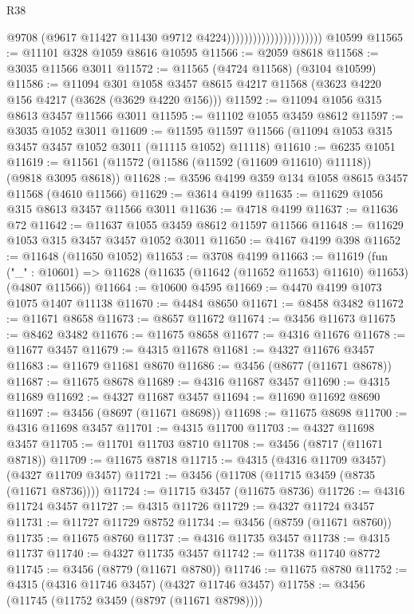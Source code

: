 \begin{lexlean}{R38}
\begin{coremodule}
                                              @9708
                                              (@9617 @11427 @11430 @9712 @4224))))))))))))))))))))))
    @10599
@11565 := @11101 @328 @1059 @8616 @10595
@11566 := @2059 @8618
@11568 := @3035 @11566 @3011
@11572 := @11565 (@4724 @11568) (@3104 @10599)
@11586 := @11094
    @301
    @1058
    @3457
    @8615
    @4217
    @11568
    (@3623 @4220 @156 @4217 (@3628 (@3629 @4220 @156)))
@11592 := @11094 @1056 @315 @8613 @3457 @11566 @3011
@11595 := @11102 @1055 @3459 @8612
@11597 := @3035 @1052 @3011
@11609 := @11595 @11597 @11566 (@11094 @1053 @315 @3457 @3457 @1052 @3011 (@11115 @1052) @11118)
@11610 := @6235 @1051
@11619 := @11561 (@11572 (@11586 (@11592 (@11609 @11610) @11118)) (@9818 @3095 @8618))
@11628 := @3596 @4199 @359 @134 @1058 @8615 @3457 @11568 (@4610 @11566)
@11629 := @3614 @4199
@11635 := @11629 @1056 @315 @8613 @3457 @11566 @3011
@11636 := @4718 @4199
@11637 := @11636 @72
@11642 := @11637 @1055 @3459 @8612 @11597 @11566
@11648 := @11629 @1053 @315 @3457 @3457 @1052 @3011
@11650 := @4167 @4199 @398
@11652 := @11648 (@11650 @1052)
@11653 := @3708 @4199
@11663 := @11619
    (fun ("_" : @10601) => @11628 (@11635 (@11642 (@11652 @11653) @11610) @11653) (@4807 @11566))
@11664 := @10600 @4595
@11669 := @4470 @4199 @1073 @1075 @1407 @11138
@11670 := @4484 @8650
@11671 := @8458 @3482
@11672 := @11671 @8658
@11673 := @8657 @11672
@11674 := @3456 @11673
@11675 := @8462 @3482
@11676 := @11675 @8658
@11677 := @4316 @11676
@11678 := @11677 @3457
@11679 := @4315 @11678
@11681 := @4327 @11676 @3457
@11683 := @11679 @11681 @8670
@11686 := @3456 (@8677 (@11671 @8678))
@11687 := @11675 @8678
@11689 := @4316 @11687 @3457
@11690 := @4315 @11689
@11692 := @4327 @11687 @3457
@11694 := @11690 @11692 @8690
@11697 := @3456 (@8697 (@11671 @8698))
@11698 := @11675 @8698
@11700 := @4316 @11698 @3457
@11701 := @4315 @11700
@11703 := @4327 @11698 @3457
@11705 := @11701 @11703 @8710
@11708 := @3456 (@8717 (@11671 @8718))
@11709 := @11675 @8718
@11715 := @4315 (@4316 @11709 @3457) (@4327 @11709 @3457)
@11721 := @3456 (@11708 (@11715 @3459 (@8735 (@11671 @8736))))
@11724 := @11715 @3457 (@11675 @8736)
@11726 := @4316 @11724 @3457
@11727 := @4315 @11726
@11729 := @4327 @11724 @3457
@11731 := @11727 @11729 @8752
@11734 := @3456 (@8759 (@11671 @8760))
@11735 := @11675 @8760
@11737 := @4316 @11735 @3457
@11738 := @4315 @11737
@11740 := @4327 @11735 @3457
@11742 := @11738 @11740 @8772
@11745 := @3456 (@8779 (@11671 @8780))
@11746 := @11675 @8780
@11752 := @4315 (@4316 @11746 @3457) (@4327 @11746 @3457)
@11758 := @3456 (@11745 (@11752 @3459 (@8797 (@11671 @8798))))

\end{coremodule}
\end{lexlean}
